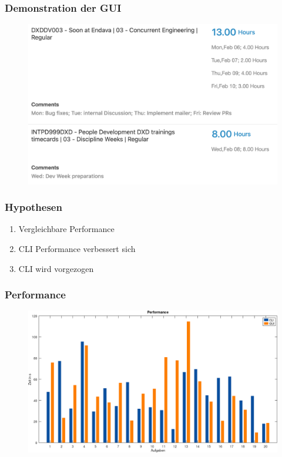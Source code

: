 \documentclass{beamer}
\begin{document}
\begin{frame}
  \frametitle{Demonstration der GUI}

  \begin{figure}[H]
    \centering
    \includegraphics[scale=0.19]{oracle-real.png}
  \end{figure}
\end{frame}

\begin{frame}
  \frametitle{Hypothesen}

  \begin{enumerate}
    \item Vergleichbare Performance
    \item CLI Performance verbessert sich
    \item CLI wird vorgezogen
  \end{enumerate}

\end{frame}

\begin{frame}
  \frametitle{Performance}

  \begin{figure}
    \centering
    \includegraphics[scale=0.28]{performance.png}
  \end{figure}
\end{frame}
\end{document}

